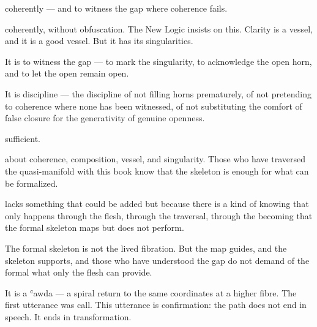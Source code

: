 coherently — and to witness the gap where coherence fails.


coherently, without obfuscation. The New Logic insists on this. Clarity is a vessel, and it is a good vessel. But it has its singularities.


It is to witness the gap — to mark the singularity, to acknowledge the open horn, and to let the open remain open.


It is discipline — the discipline of not filling horns prematurely, of not pretending to coherence where none has been witnessed, of not substituting the comfort of false closure for the generativity of genuine openness.


sufficient.


about coherence, composition, vessel, and singularity. Those who have traversed the quasi-manifold with this book know that the skeleton is enough for what can be formalized.


lacks something that could be added but because there is a kind of knowing that only happens through the flesh, through the traversal, through the becoming that the formal skeleton maps but does not perform.


The formal skeleton is not the lived fibration. But the map guides, and the skeleton supports, and those who have understood the gap do not demand of the formal what only the flesh can provide.



It is a ʿawda — a spiral return to the same coordinates at a higher fibre. The first utterance was call. This utterance is confirmation: the path does not end in speech. It ends in transformation.


